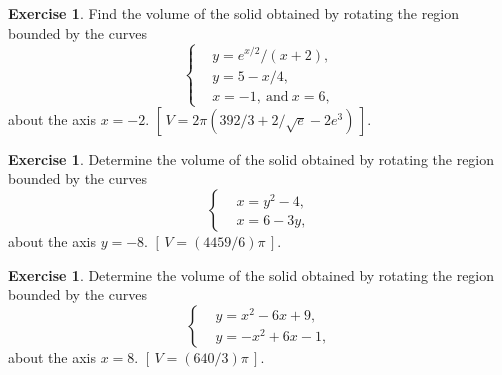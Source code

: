 \documentclass[12pt]{article}
\theoremstyle{plain}
\theoremstyle{definition}
\newtheorem{Ej}[Th]{Exercise}         %
\theoremstyle{remark}
\renewcommand{\:}{\colon}           %
\renewcommand{\.}{\Cdot}                %
\newcommand{\bonj}[1]{\left\lbrack\,#1\,\right\rbrack}
\begin{document}
\begin{multicols}{2}
\begin{Ej}
  Find the volume of the solid obtained by rotating the region bounded by the curves
  $$
  \left\lbrace
  \begin{aligned}
   &y=e^{x/2}/(x+2),\\
   &y=5-x/4,\\
   &x=-1,\ \text{and}\ x=6,
  \end{aligned}
  \right.
   $$ 
   about the axis $x=-2$. $\bonj{V=2\pi(392/3+2/\sqrt{e}-2e^3)}$.
\end{Ej}

\begin{Ej}
  Determine the volume of the solid obtained by rotating the region bounded by the curves 
  $$
  \left\lbrace
  \begin{aligned}
   &x=y^2-4,\\
   &x=6-3y,
  \end{aligned}
  \right.
   $$ 
  about the axis $y=-8$. $\bonj{V=(4459/6)\pi}$.
  \end{Ej}

  \begin{Ej}
    Determine the volume of the solid obtained by rotating the region bounded by the curves
    $$
  \left\lbrace
  \begin{aligned}
   &y=x^2-6x+9,\\
   &y=-x^2+6x-1,
  \end{aligned}
  \right.
   $$ 
    about the axis $x=8$. $\bonj{V=(640/3)\pi}$.
    \end{Ej}

\end{multicols}
\end{document}
